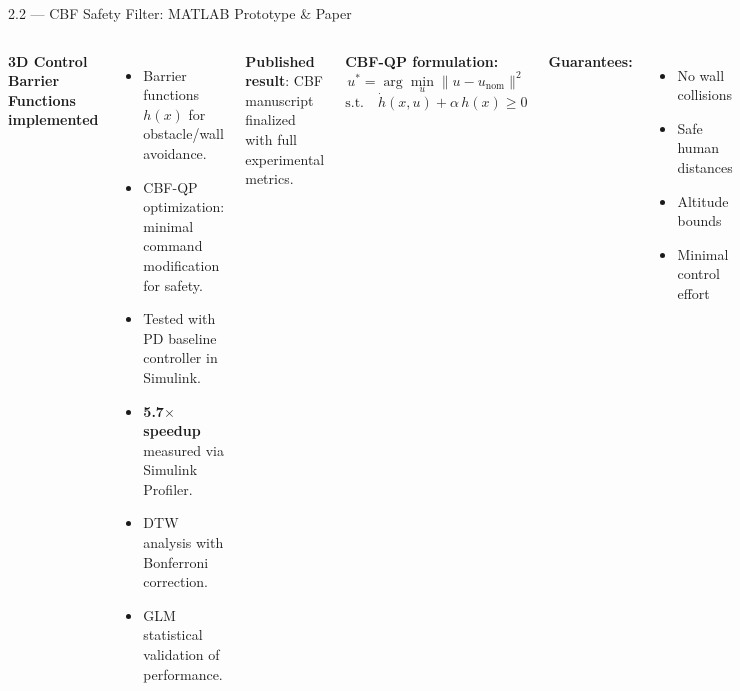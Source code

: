 \documentclass[aspectratio=169, 11pt]{beamer}
\begin{document}
\begin{frame}{2.2 --- CBF Safety Filter: MATLAB Prototype \& Paper}
\begin{columns}[T]
\textbf{3D Control Barrier Functions implemented}
\begin{itemize}
  \item Barrier functions $h(x)$ for obstacle/wall avoidance.
  \item CBF-QP optimization: minimal command modification for safety.
  \item Tested with PD baseline controller in Simulink.
  \item \textbf{5.7$\times$ speedup} measured via Simulink Profiler.
  \item DTW analysis with Bonferroni correction.
  \item GLM statistical validation of performance.
\end{itemize}

\vspace{0.3em}
\textbf{Published result}: CBF manuscript finalized with full experimental metrics.

\textbf{CBF-QP formulation:}
\[
  u^* = \arg\min_{u} \|u - u_\text{nom}\|^2
\]
\[
  \text{s.t.}\quad \dot{h}(x,u) + \alpha\, h(x) \geq 0
\]

\vspace{0.5em}
\textbf{Guarantees:}
\begin{itemize}
  \item[\checkmark] No wall collisions
  \item[\checkmark] Safe human distances
  \item[\checkmark] Altitude bounds
  \item[\checkmark] Minimal control effort
\end{itemize}
\end{columns}
\end{frame}
\end{document}
